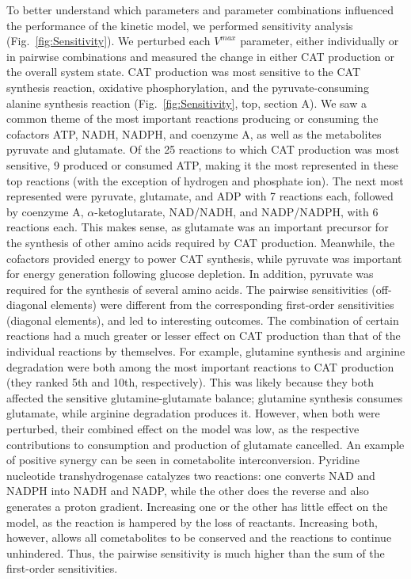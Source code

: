 \documentclass[12pt]{article}
\begin{document}
To better understand which parameters and parameter combinations influenced the performance of the kinetic model, we performed sensitivity analysis (Fig.~\ref{fig:Sensitivity}).
We perturbed each $V^{max}$ parameter, either individually or in pairwise combinations and measured the change in either CAT production or the overall system state.
CAT production was most sensitive to the CAT synthesis reaction, oxidative phosphorylation, and the pyruvate-consuming alanine synthesis reaction (Fig.~\ref{fig:Sensitivity}, top, section A).
We saw a common theme of the most important reactions producing or consuming the cofactors ATP, NADH, NADPH, and coenzyme A, as well as the metabolites pyruvate and glutamate.
Of the 25 reactions to which CAT production was most sensitive, 9 produced or consumed ATP, making it the most represented in these top reactions (with the exception of hydrogen and phosphate ion).
The next most represented were pyruvate, glutamate, and ADP with 7 reactions each, followed by coenzyme A, $\alpha$-ketoglutarate, NAD/NADH, and NADP/NADPH, with 6 reactions each.
This makes sense, as glutamate was an important precursor for the synthesis of other amino acids required by CAT production.
Meanwhile, the cofactors provided energy to power CAT synthesis, while pyruvate was important for energy generation following glucose depletion.
In addition, pyruvate was required for the synthesis of several amino acids.
The pairwise sensitivities (off-diagonal elements) were different from the corresponding first-order sensitivities (diagonal elements), and led to interesting outcomes.
The combination of certain reactions had a much greater or lesser effect on CAT production than that of the individual reactions by themselves.
For example, glutamine synthesis and arginine degradation were both among the most important reactions to CAT production (they ranked 5th and 10th, respectively).
This was likely because they both affected the sensitive glutamine-glutamate balance; glutamine synthesis consumes glutamate, while arginine degradation produces it.
However, when both were perturbed, their combined effect on the model was low, as the respective contributions to consumption and production of glutamate cancelled.
An example of positive synergy can be seen in cometabolite interconversion.
Pyridine nucleotide transhydrogenase catalyzes two reactions: one converts NAD and NADPH into NADH and NADP, while the other does the reverse and also generates a proton gradient.
Increasing one or the other has little effect on the model, as the reaction is hampered by the loss of reactants.
Increasing both, however, allows all cometabolites to be conserved and the reactions to continue unhindered.
Thus, the pairwise sensitivity is much higher than the sum of the first-order sensitivities.
\end{document}
